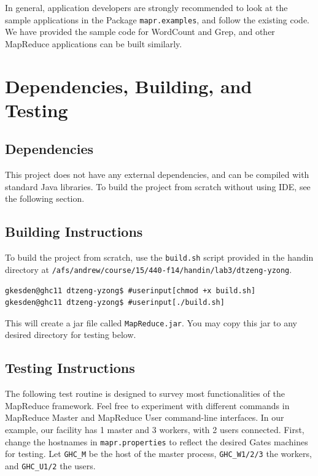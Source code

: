 \documentclass{article} %
\begin{document}
\par\qquad In general, application developers are strongly recommended to look at the sample applications in the Package \texttt{mapr.examples}, and follow the existing code. We have provided the sample code for WordCount and Grep, and other MapReduce applications can be built similarly.

\section{Dependencies, Building, and Testing}

\subsection{Dependencies}

\par\qquad This project does not have any external dependencies, and can be compiled with standard Java libraries. To build the project from scratch without using IDE, see the following section.

\subsection{Building Instructions}

\par\qquad To build the project from scratch, use the \texttt{build.sh} script provided in the handin directory at \texttt{/afs/andrew/course/15/440-f14/handin/lab3/dtzeng-yzong}.

\begin{Verbatim}[commandchars=\#\[\]]
gkesden@ghc11 dtzeng-yzong$ #userinput[chmod +x build.sh]
gkesden@ghc11 dtzeng-yzong$ #userinput[./build.sh]
\end{Verbatim}

\par\qquad This will create a jar file called \texttt{MapReduce.jar}.  You may copy this jar to any desired directory for testing below.

\subsection{Testing Instructions}

\par\qquad The following test routine is designed to survey most functionalities of the MapReduce framework. Feel free to experiment with different commands in MapReduce Master and MapReduce User command-line interfaces.  In our example, our facility has 1 master and 3 workers, with 2 users connected.  First, change the hostnames in \texttt{mapr.properties} to reflect the desired Gates machines for testing.  Let \texttt{GHC\_M} be the host of the master process, \texttt{GHC\_{W1/2/3}} the workers, and \texttt{GHC\_{U1/2}} the users.
\end{document}
